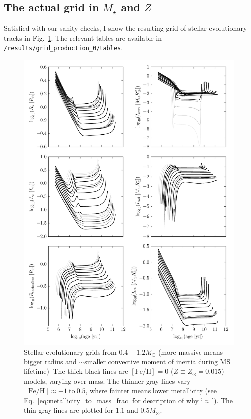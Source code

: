\documentclass{article}
\begin{document}
\subsection{The actual grid in $M_\star$ and $Z$}
Satisfied with our sanity checks, I show the resulting grid of stellar 
evolutionary tracks in Fig.~\ref{fig:grids}.
The relevant tables are available in 
\texttt{/results/grid\_production\_0/tables}.


\newpage
\clearpage
\begin{figure}[t]
	\thispagestyle{empty}
	\centering
	\includegraphics[width=\textwidth]{figs/grids_2by3.pdf}
	\caption{Stellar evolutionary grids from $0.4-1.2M_\odot$ (more massive 
	means bigger radius and $\sim$smaller convective moment of inertia during 
	MS lifetime).
	The thick black lines are $\mathrm{[Fe/H]}=0$ ($Z\equiv Z_\odot = 0.015$) 
	models, 
	varying over mass.
	The thinner gray lines vary $\mathrm{[Fe/H]}\approx-1\ \mathrm{to}\ 0.5$, 
	where fainter means lower metallicity (see 
	Eq.~\ref{eq:metallicity_to_mass_frac} for description of why `$\approx$'). 
	The thin gray lines are plotted for $1.1$ and $0.5M_\odot$.		
	}
	\label{fig:grids}
\end{figure}
\end{document}
